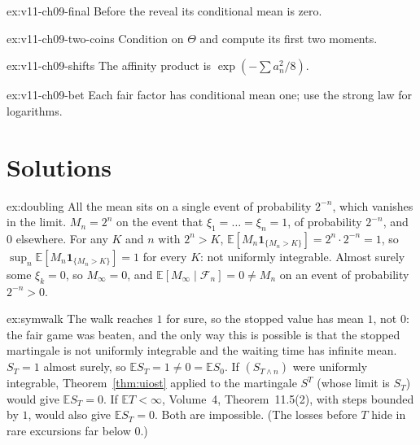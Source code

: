 \begin{hint}{ex:v11-ch09-final}
Before the reveal its conditional mean is zero.
\end{hint}

\begin{hint}{ex:v11-ch09-two-coins}
Condition on $\Theta$ and compute its first two moments.
\end{hint}

\begin{hint}{ex:v11-ch09-shifts}
The affinity product is $\exp(-\sum a_n^2/8)$.
\end{hint}

\begin{hint}{ex:v11-ch09-bet}
Each fair factor has conditional mean one; use the strong law for logarithms.
\end{hint}

\section{Solutions}

\begin{solution}{ex:doubling}
\idea All the mean sits on a single event of probability $2^{-n}$, which vanishes in the limit.
\writeup $M_n=2^n$ on the event that $\xi_1=\dots=\xi_n=1$, of probability $2^{-n}$, and $0$ elsewhere. For any $K$ and $n$ with $2^n>K$, $\mathbb E[M_n\mathbf 1_{\{M_n>K\}}]=2^n\cdot2^{-n}=1$, so
$\sup_n\mathbb E[M_n\mathbf 1_{\{M_n>K\}}]=1$ for every $K$: not uniformly integrable. Almost surely some $\xi_k=0$, so $M_\infty=0$, and $\mathbb E[M_\infty\mid\mathcal F_n]=0\neq M_n$ on an event of probability $2^{-n}>0$.
\end{solution}

\begin{solution}{ex:symwalk}
\idea The walk reaches $1$ for sure, so the stopped value has mean $1$, not $0$: the fair game was beaten, and the only way this is possible is that the stopped martingale is not uniformly integrable and the waiting time has infinite mean.
\writeup $S_T=1$ almost surely, so $\mathbb ES_T=1\neq0=\mathbb ES_0$. If $(S_{T\wedge n})$ were uniformly integrable, Theorem~\ref{thm:uiost} applied to the martingale $S^T$ (whose limit is $S_T$) would give
$\mathbb ES_T=0$. If $\mathbb ET<\infty$, Volume~4, Theorem~11.5(2), with steps bounded by $1$, would also give $\mathbb ES_T=0$. Both are impossible. (The losses before $T$ hide in rare excursions far below $0$.)
\end{solution}

